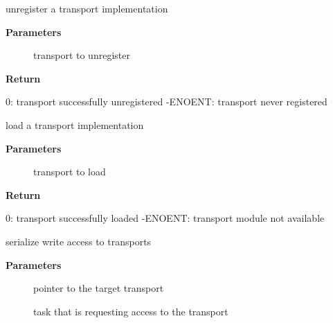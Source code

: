 \documentclass[a4paper,8pt,english]{sphinxmanual}
\begin{document}
\begin{fulllineitems}
\label{networking/kapi:c.xprt_unregister_transport}
unregister a transport implementation

\end{fulllineitems}


\textbf{Parameters}
\begin{description}
\item[{}] \leavevmode
transport to unregister

\end{description}

\textbf{Return}

0:           transport successfully unregistered
-ENOENT:     transport never registered

\begin{fulllineitems}
\label{networking/kapi:c.xprt_load_transport}
load a transport implementation

\end{fulllineitems}


\textbf{Parameters}
\begin{description}
\item[{}] \leavevmode
transport to load

\end{description}

\textbf{Return}

0:           transport successfully loaded
-ENOENT:     transport module not available

\begin{fulllineitems}
\label{networking/kapi:c.xprt_reserve_xprt}
serialize write access to transports

\end{fulllineitems}


\textbf{Parameters}
\begin{description}
\item[{}] \leavevmode
pointer to the target transport

\item[{}] \leavevmode
task that is requesting access to the transport

\end{description}
\end{document}
